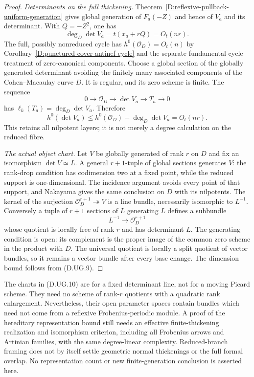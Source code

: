 \begin{proof}
\emph{Determinants on the full thickening.}
Theorem~\ref{D:reflexive-pullback-uniform-generation} gives
global generation of $F_a(-Z)$ and hence of $V_a$ and its
determinant. With $Q=-Z^2$, one has
\[
               \deg_D\det V_a=t(x_a+rQ)=O_t(nr).
\]
The full, possibly nonreduced cycle has
$h^0(\mathcal O_D)=O_t(n)$ by
Corollary~\ref{D:punctured-cover-antinef-cycle} and the
separate fundamental-cycle treatment of zero-canonical
components. Choose a global section of the globally
generated determinant avoiding the finitely many associated
components of the Cohen--Macaulay curve $D$. It is regular,
and its zero scheme is finite. The sequence
\[
     0\longrightarrow\mathcal O_D\longrightarrow\det V_a
                  \longrightarrow T_a\longrightarrow0
\]
has $\ell_k(T_a)=\deg_D\det V_a$. Therefore
\[
       h^0(\det V_a)\le h^0(\mathcal O_D)+\deg_D\det V_a
                         =O_t(nr).
\]
This retains all nilpotent layers; it is not merely a degree
calculation on the reduced fibre.

\emph{The actual object chart.}
Let $V$ be globally generated of rank $r$ on $D$ and fix an
isomorphism $\det V\simeq L$. A general $r+1$-tuple of global
sections generates $V$: the rank-drop condition has codimension
two at a fixed point, while the reduced support is one-dimensional.
The incidence argument avoids every point of that support,
and Nakayama gives the same conclusion on $D$ with its
nilpotents. The kernel of the surjection
$\mathcal O_D^{r+1}\twoheadrightarrow V$ is a line bundle,
necessarily isomorphic to $L^{-1}$. Conversely a tuple of
$r+1$ sections of $L$ generating $L$ defines a subbundle
\[
        L^{-1}\longrightarrow\mathcal O_D^{r+1}
\]
whose quotient is locally free of rank $r$ and has determinant
$L$. The generating condition is open: its complement is the
proper image of the common zero scheme in the product with $D$.
The universal quotient is locally a split quotient of vector
bundles, so it remains a vector bundle after every base change.
The dimension bound follows from (D.UG.9).
\end{proof}

\begin{remark}
The charts in (D.UG.10) are for a fixed determinant line, not
for a moving Picard scheme. They need no scheme of rank-$r$
quotients with a quadratic rank enlargement. Nevertheless,
their open parameter spaces contain bundles which need not
come from a reflexive Frobenius-periodic module. A proof of
the hereditary representation bound still needs an effective
finite-thickening realization and isomorphism criterion,
including all Frobenius arrows and Artinian families, with
the same degree-linear complexity. Reduced-branch framing
does not by itself settle geometric normal thickenings or
the full formal overlap. No representation count or new
finite-generation conclusion is asserted here.
\end{remark}
